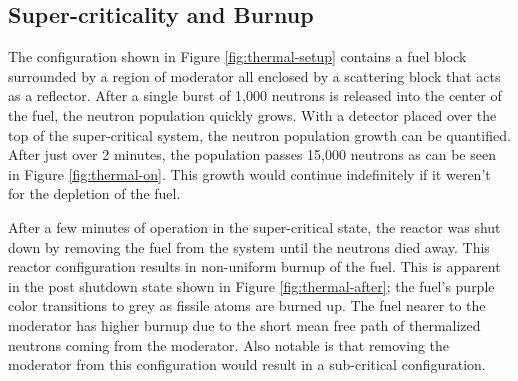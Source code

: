 \documentclass{anstrans}
\begin{document}
\subsection{Super-criticality and Burnup}

The configuration shown in Figure \ref{fig:thermal-setup} contains a fuel
block surrounded by a region of moderator all enclosed by a scattering block
that acts as a reflector.  After a single burst of 1,000 neutrons is released
into the center of the fuel, the neutron population quickly grows.  With a
detector placed over the top of the super-critical system, the neutron
population growth can be quantified. After just over 2 minutes, the population
passes 15,000 neutrons as can be seen in Figure \ref{fig:thermal-on}.  This
growth would continue indefinitely if it weren't for the depletion of the
fuel.

After a few minutes of operation in the super-critical state, the reactor was
shut down by removing the fuel from the system until the neutrons died away.
This reactor configuration results in non-uniform burnup of the fuel. This is
apparent in the post shutdown state shown in Figure \ref{fig:thermal-after};
the fuel's purple color transitions to grey as fissile atoms are burned up.
The fuel nearer to the moderator has higher burnup due to the short mean free
path of thermalized neutrons coming from the moderator.  Also notable is that
removing the moderator from this configuration would result in a sub-critical
configuration. 
\end{document}

